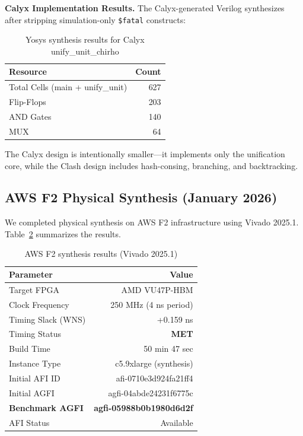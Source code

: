 \documentclass[11pt,a4paper]{article}
\begin{document}
\textbf{Calyx Implementation Results.}
The Calyx-generated Verilog synthesizes after stripping simulation-only
\texttt{\$fatal} constructs:

\begin{table}[ht]
\centering
\caption{Yosys synthesis results for Calyx unify\_unit\_chirho}
\label{tab:calyx_results_chirho}
\begin{tabular}{lr}
\toprule
\textbf{Resource} & \textbf{Count} \\
\midrule
Total Cells (main + unify\_unit) & 627 \\
Flip-Flops & 203 \\
AND Gates & 140 \\
MUX & 64 \\
\bottomrule
\end{tabular}
\end{table}

The Calyx design is intentionally smaller---it implements only the unification
core, while the Clash design includes hash-consing, branching, and backtracking.

\subsection{AWS F2 Physical Synthesis (January 2026)}
\label{subsec:aws_f2_chirho}

We completed physical synthesis on AWS F2 infrastructure using Vivado 2025.1.
Table~\ref{tab:f2_results_chirho} summarizes the results.

\begin{table}[ht]
\centering
\caption{AWS F2 synthesis results (Vivado 2025.1)}
\label{tab:f2_results_chirho}
\begin{tabular}{lr}
\toprule
\textbf{Parameter} & \textbf{Value} \\
\midrule
Target FPGA & AMD VU47P-HBM \\
Clock Frequency & 250 MHz (4 ns period) \\
Timing Slack (WNS) & +0.159 ns \\
Timing Status & \textbf{MET} \\
Build Time & 50 min 47 sec \\
Instance Type & c5.9xlarge (synthesis) \\
\midrule
Initial AFI ID & afi-0710e3d924fa21ff4 \\
Initial AGFI & agfi-04abde24231f6775c \\
\textbf{Benchmark AGFI} & \textbf{agfi-05988b0b1980d6d2f} \\
AFI Status & Available \\
\bottomrule
\end{tabular}
\end{table}
\end{document}
